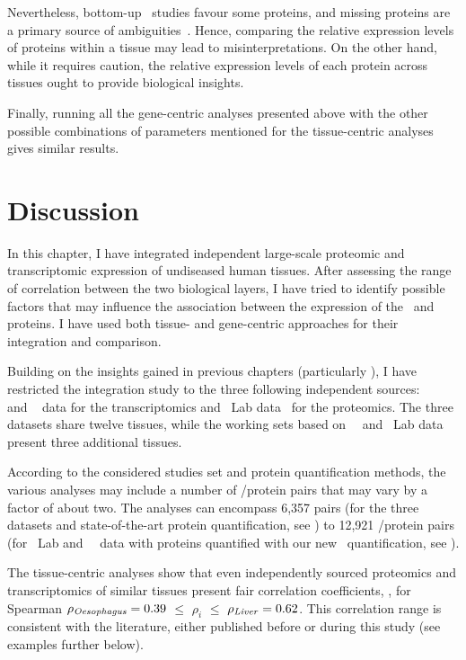 Nevertheless, bottom-up \ms\ studies favour some proteins,
and missing proteins are a primary source of ambiguities~.
Hence, comparing the relative expression levels of proteins within a tissue
may lead to misinterpretations.
On the other hand, while it requires caution,
the relative expression levels of each protein across tissues
ought to provide biological insights.

Finally, running all the gene-centric analyses presented above
with the other possible combinations of parameters
mentioned for the tissue-centric analyses
gives similar results.

\vspace{-2mm}
\section{Discussion}
\vspace{-2mm}

In this chapter,
I have integrated independent large-scale proteomic and transcriptomic expression
of undiseased human tissues.
After assessing the range of correlation between the two biological layers,
I have tried to identify possible factors
that may influence the association
between the expression of the \mRNAs\ and proteins.
I have used both tissue- and gene-centric approaches
for their integration and comparison.

Building on the insights gained in previous chapters
(particularly ),
I have restricted the integration study to
the three following independent sources:
\uhlen\ \etal{}~
and \gtex~ data for the transcriptomics
and \pandey\ Lab data~ for the proteomics.
The three datasets share twelve tissues,
while the working sets based on \uhlen\ \etal\ and \pandey\ Lab data
present three additional tissues.

According to the considered studies set and protein quantification methods,
the various analyses may include a number of \mRNA/protein pairs
that may vary by a factor of about two.
The analyses can encompass 6,357 pairs
(for the three datasets and state-of-the-art protein quantification,
see )
to 12,921 \mRNA/protein pairs (for \pandey\ Lab and \uhlen\ \etal\ data
with proteins quantified with our new \PPKM\ quantification,
see ).

The tissue-centric analyses show that
even independently sourced proteomics and transcriptomics of similar tissues
present fair correlation coefficients,
\eg, for Spearman $\rho_{\text{\emph{Oesophagus}}}=0.39$
$≤$ $\rho_i$ $≤$ $\rho_{\text{\emph{Liver}}}=0.62$.
This correlation range is consistent with the literature,
either published before or during this study (see examples further below).

